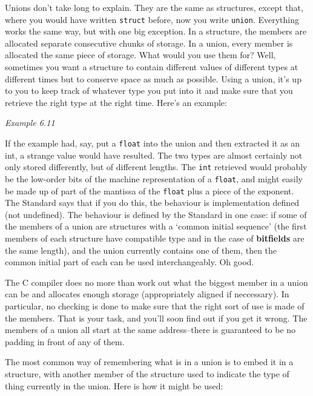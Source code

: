   

  Unions don't take long to explain. They are the same as structures, except
   that, where you would have written \texttt{struct} before, now you write
   \texttt{union}. Everything works the same way, but with one big
   exception. In a structure, the members are allocated separate consecutive
   chunks of storage. In a union, every member is allocated the same piece of
   storage. What would you use them for? Well, sometimes you want a structure
   to contain different values of different types at different times but to
   conserve space as much as possible. Using a union, it's up to you to keep
   track of whatever type you put into it and make sure that you retrieve the
   right type at the right time. Here's an example:


  \begin{center}\textit{Example 6.11}\end{center}


  If the example had, say, put a \texttt{float} into the union and then
   extracted it as an int, a strange value would have resulted. The two types
   are almost certainly not only stored differently, but of different lengths.
   The \texttt{int} retrieved would probably be the low-order bits of the
   machine representation of a \texttt{float}, and might easily be made up
   of part of the mantissa of the \texttt{float} plus a piece of the
   exponent. The Standard says that if you do this, the behaviour is
   implementation defined (not undefined). The behaviour is defined by the
   Standard in one case: if some of the members of a union are structures with
   a `common initial sequence' (the first members of each structure have
   compatible type and in the case of \textbf{bitfields} are the same
   length), and the union currently contains one of them, then the common
   initial part of each can be used interchangeably. Oh good.


  The C compiler does no more than work out what the biggest member in
   a union can be and allocates enough storage (appropriately aligned if
   neccessary). In particular, no checking is done to make sure that the right
   sort of use is made of the members. That is your task, and you'll soon find
   out if you get it wrong. The members of a union all start at the same
   address--there is guaranteed to be no padding in front of any of
   them.


  The most common way of remembering what is in a union is to embed it in
   a structure, with another member of the structure used to indicate the type
   of thing currently in the union. Here is how it might be used:


